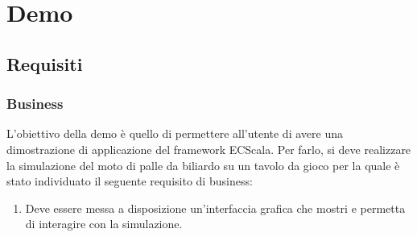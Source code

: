 \chapter{Demo}\label{ch:demo}

\section{Requisiti}\label{sec:demo-requisiti}

\subsection{Business}\label{subsec:demo-business}
L'obiettivo della demo è quello di permettere all'utente di avere una dimostrazione di applicazione del framework ECScala.
Per farlo, si deve realizzare la simulazione del moto di palle da biliardo su un tavolo da gioco per la quale è
stato individuato il seguente requisito di business:
\begin{enumerate}[label=\textbf{\ref{subsec:demo-business}.\arabic*}]
    \item \label{itm:db1} Deve essere messa a disposizione un'interfaccia grafica che mostri e permetta di interagire con la simulazione.
\end{enumerate}

